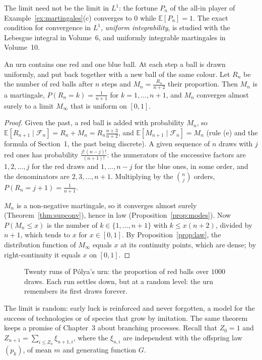 The limit need not be the limit in $L^1$: the fortune $P_n$ of the all-in player of Example~\ref{ex:martingales}(c) converges to $0$ while $\mathbb E[P_n]=1$.
The exact condition for convergence in $L^1$, \emph{uniform integrability}, is studied with the Lebesgue integral in Volume~6, and
uniformly integrable martingales in Volume~10.

\begin{theorem}\label{thm:polyaurn}
An urn contains one red and one blue ball. At each step a ball is drawn uniformly, and put back together with a new
ball of the same colour. Let $R_n$ be the number of red balls after $n$ steps and $M_n=\frac{R_n}{n+2}$ their proportion. Then $M_n$ is a martingale,
$P(R_n=k)=\frac1{n+1}$ for $k=1,\dots,n+1$, and $M_n$ converges almost surely to a limit $M_\infty$ that is uniform on $[0,1]$.
\end{theorem}
\begin{proof}
Given the past, a red ball is added with probability $M_n$, so $\mathbb E[R_{n+1}\mid\mathcal F_n]=R_n+M_n=R_n\frac{n+3}{n+2}$, and $\mathbb E[M_{n+1}\mid\mathcal F_n]=M_n$ (rule (e) and the
formula of Section~1, the past being discrete). A given sequence of $n$ draws with $j$ red ones has probability
$\frac{j!\,(n-j)!}{(n+1)!}$: the numerators of the successive factors are $1,2,\dots,j$ for the red draws and $1,\dots,n-j$ for the blue ones, in some order,
and the denominators are $2,3,\dots,n+1$. Multiplying by the $\binom nj$ orders, $P(R_n=j+1)=\frac1{n+1}$.

$M_n$ is a non-negative martingale, so it converges almost surely (Theorem~\ref{thm:supconv}), hence in law (Proposition~\ref{prop:modes}). Now $P(M_n\le x)$ is
the number of $k\in\{1,\dots,n+1\}$ with $k\le x(n+2)$, divided by $n+1$, which tends to $x$ for $x\in[0,1]$. By Proposition~\ref{prop:law}, the distribution
function of $M_\infty$ equals $x$ at its continuity points, which are dense; by right-continuity it equals $x$ on $[0,1]$.
\end{proof}

\begin{figure}[ht]
\centering
{}
\caption{Twenty runs of P\'olya's urn: the proportion of red balls over $1000$ draws. Each run settles down, but at a
random level: the urn remembers its first draws forever.}
\label{fig:polya}
\end{figure}

The limit is random: early luck is reinforced and never forgotten, a model for the success of technologies or of
species that grow by imitation. The same theorem keeps a promise of Chapter~3 about branching processes. Recall
that $Z_0=1$ and $Z_{n+1}=\sum_{i\le Z_n}\xi_{n+1,i}$, where the $\xi_{n,i}$ are independent with the offspring law $(p_k)$, of mean $m$ and generating function $G$.

